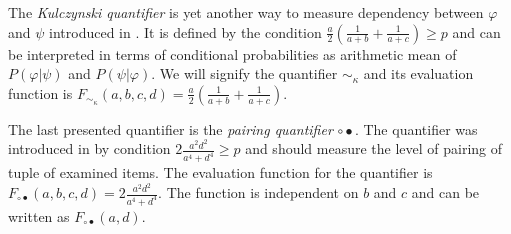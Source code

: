 The {\it Kulczynski quantifier \/} is yet another way to measure dependency between 
$\varphi$ and $\psi$ introduced in  \cite{Han:07}. It is defined by the condition
$ \frac{a}{2}(\frac{1}{a+b}+\frac{1}{a+c}) \geq p$ and can be interpreted in 
terms of conditional probabilities as arithmetic mean of 
$P(\varphi|\psi)$ and $P(\psi|\varphi)$. We will signify the quantifier 
$ \sim_{\kappa} $ and its evaluation function is 
$F_{\sim_{\kappa}}(a,b,c,d) =  \frac{a}{2}(\frac{1}{a+b}+\frac{1}{a+c})$. 

The last presented quantifier is the {\it pairing quantifier \/} 
$ \circ\bullet $. The quantifier was introduced in \cite{Kupka} by condition
$2\frac{a^{2}d^{2}}{a^{4}+d^{4}} \geq p$
and should measure the level of pairing of tuple of examined items. The evaluation
function for the quantifier is 
$F_{\circ\bullet}(a,b,c,d) = 2\frac{a^{2}d^{2}}{a^{4}+d^{4}}$. The function is
independent on $b$ and $c$ and can be written as $F_{\circ\bullet}(a,d)$.
